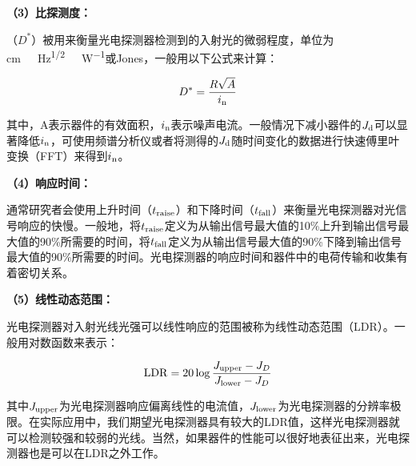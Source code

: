 \documentclass[forlib]{WHUMaster}   %
\begin{document}
{\textbf{（3）比探测度：}%



（$D^*$）被用来衡量光电探测器检测到的入射光的微弱程度，单位为\si{cm\ Hz^{1/2}\ W^{-1}}或Jones，一般用以下公式来计算：

\begin{equation}\label{eq-1.3.3}
D^* = \frac{R\sqrt{A}}{i_{\rm{n}}}
\end{equation}

其中，A表示器件的有效面积，$i_{\rm{n}}$表示噪声电流。一般情况下减小器件的$J_{\rm{d}}$可以显著降低$i_{\rm{n}}$，可使用频谱分析仪或者将测得的$J_{\rm{d}}$随时间变化的数据进行快速傅里叶变换（FFT）来得到$i_{\rm{n}}$\cite{RN75}。

\textbf{（4）响应时间：}

通常研究者会使用上升时间（$t_{\rm{raise}}$）和下降时间（$t_{\rm{fall}}$）来衡量光电探测器对光信号响应的快慢\cite{RN73}。一般地，将$t_{\rm{raise}}$定义为从输出信号最大值的10\%上升到输出信号最大值的90\%所需要的时间，将$t_{\rm{fall}}$定义为从输出信号最大值的90\%下降到输出信号最大值的90\%所需要的时间\cite{RN118,RN73,RN75}。光电探测器的响应时间和器件中的电荷传输和收集有着密切关系。

\textbf{（5）线性动态范围：}

光电探测器对入射光线光强可以线性响应的范围被称为线性动态范围（LDR）\cite{RN118,RN73}。一般用对数函数来表示：

\begin{equation}\label{eq-1.3.8}
{\rm{LDR} } = 20\log\frac{J_{\rm{upper}} - J_D}{J_{\rm{lower}} - J_D}
\end{equation}

其中$J_{\rm{upper}}$为光电探测器响应偏离线性的电流值，$J_{\rm{lower}}$为光电探测器的分辨率极限\cite{RN118}。在实际应用中，我们期望光电探测器具有较大的LDR值，这样光电探测器就可以检测较强和较弱的光线。当然，如果器件的性能可以很好地表征出来，光电探测器也是可以在LDR之外工作。

}
\end{document}
